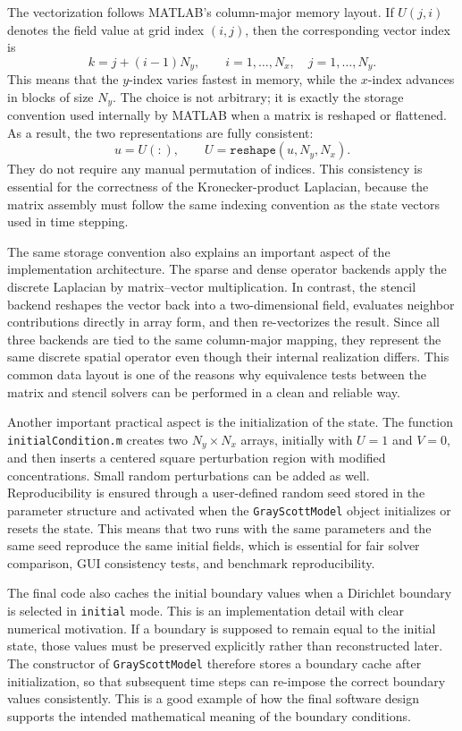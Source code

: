 The vectorization follows MATLAB's column-major memory layout. If $U(j,i)$ denotes the field value at grid index $(i,j)$, then the corresponding vector index is
\begin{equation}
k = j + (i-1)N_y,
\qquad
i=1,\dots,N_x,\quad j=1,\dots,N_y.
\label{eq:column_major_mapping_numimpl}
\end{equation}
This means that the $y$-index varies fastest in memory, while the $x$-index advances in blocks of size $N_y$. The choice is not arbitrary; it is exactly the storage convention used internally by MATLAB when a matrix is reshaped or flattened. As a result, the two representations are fully consistent:
\[
u = U(:), \qquad U = \texttt{reshape}(u,N_y,N_x).
\]
They do not require any manual permutation of indices. This consistency is essential for the correctness of the Kronecker-product Laplacian, because the matrix assembly must follow the same indexing convention as the state vectors used in time stepping.

The same storage convention also explains an important aspect of the implementation architecture. The sparse and dense operator backends apply the discrete Laplacian by matrix--vector multiplication. In contrast, the stencil backend reshapes the vector back into a two-dimensional field, evaluates neighbor contributions directly in array form, and then re-vectorizes the result. Since all three backends are tied to the same column-major mapping, they represent the same discrete spatial operator even though their internal realization differs. This common data layout is one of the reasons why equivalence tests between the matrix and stencil solvers can be performed in a clean and reliable way.

Another important practical aspect is the initialization of the state. The function \texttt{initialCondition.m} creates two $N_y \times N_x$ arrays, initially with $U=1$ and $V=0$, and then inserts a centered square perturbation region with modified concentrations. Small random perturbations can be added as well. Reproducibility is ensured through a user-defined random seed stored in the parameter structure and activated when the \texttt{GrayScottModel} object initializes or resets the state. This means that two runs with the same parameters and the same seed reproduce the same initial fields, which is essential for fair solver comparison, GUI consistency tests, and benchmark reproducibility.

The final code also caches the initial boundary values when a Dirichlet boundary is selected in \texttt{initial} mode. This is an implementation detail with clear numerical motivation. If a boundary is supposed to remain equal to the initial state, those values must be preserved explicitly rather than reconstructed later. The constructor of \texttt{GrayScottModel} therefore stores a boundary cache after initialization, so that subsequent time steps can re-impose the correct boundary values consistently. This is a good example of how the final software design supports the intended mathematical meaning of the boundary conditions.

